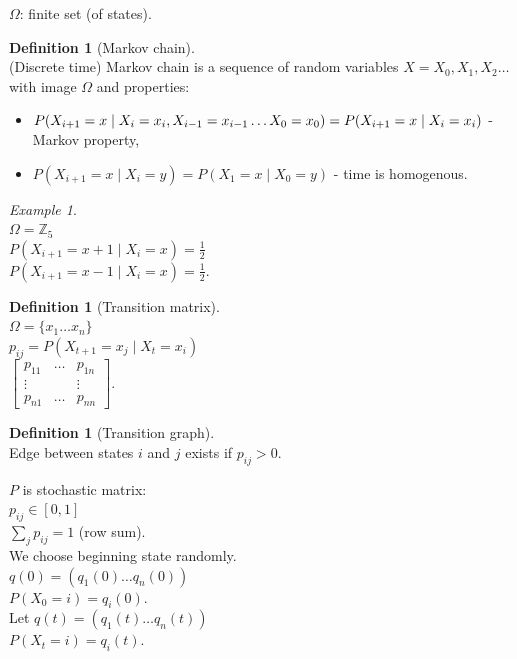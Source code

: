 \documentclass[a4paper, 12pt]{book}
\theoremstyle{definition}
\newtheorem{defn}[counter]{Definition}
\theoremstyle{remark}
\newtheorem*{ex}{Example}
\newcommand{\Z}{\mathbb{Z}}
\begin{document}
$\Omega$: finite set (of states).
\begin{defn}[Markov chain] \text{} \\
  (Discrete time) Markov chain is a sequence of random variables $X = X_0, X_1, X_2 \dots$ with image $\Omega$ and properties:
  \begin{itemize}
    \item $P(X_{i+1} = x \mid X_i = x_i, X_{i-1} = x_{i-1} \dots X_0 = x_0) =\\ P(X_{i+1} = x \mid X_i = x_i)$
      - Markov property,
    \item $P(X_{i+1} = x \mid X_i = y) = P(X_1 = x \mid X_0 = y)$ - time is homogenous.
  \end{itemize}
\end{defn}
\begin{ex} \text{} \\
  $\Omega = \Z_5$ \\
  $P(X_{i+1} = x+1 \mid X_i = x) = \frac{1}{2}$ \\
  $P(X_{i+1} = x-1 \mid X_i = x) = \frac{1}{2}$. \\
\end{ex}
\begin{defn}[Transition matrix] \text{} \\
  $\Omega = \{x_1 \dots x_n\}$ \\
  $p_{ij} = P(X_{t+1} = x_j \mid X_t = x_i)$ \\
  $\begin{bmatrix}
    p_{11} & \dots & p_{1n} \\
    \vdots & & \vdots \\
    p_{n1} & \dots & p_{nn}
  \end{bmatrix}$.
\end{defn}
\begin{defn}[Transition graph] \text{} \\ 
  Edge between states $i$ and $j$ exists if $p_{ij} > 0$.
\end{defn}
$P$ is stochastic matrix: \\
$p_{ij} \in [0,1]$ \\
$\sum_j p_{ij} = 1$ (row sum). \\
We choose beginning state randomly. \\
$q(0) = (q_1(0) \dots q_n(0))$ \\
$P(X_0 = i) = q_i(0)$. \\
Let $q(t) = (q_1(t) \dots q_n(t))$ \\
$P(X_t = i) = q_i(t)$. \\
\end{document}

